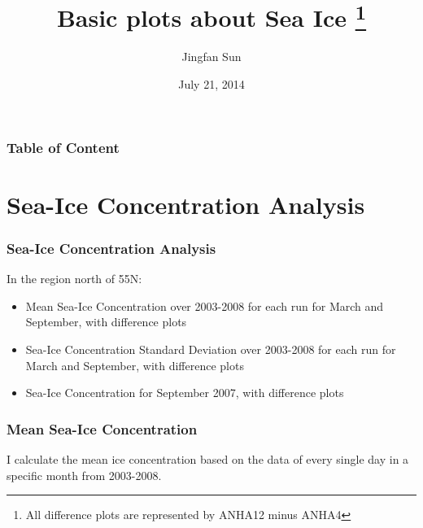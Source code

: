 \documentclass{beamer}
\title{Basic plots about Sea Ice
   \thanks{All difference plots are represented by ANHA12 minus ANHA4}
}
\author{
Jingfan Sun
}
\date{July 21, 2014}
\begin{document}
 

\begin{frame}
\titlepage
\end{frame}

\begin{frame}
\frametitle{Table of Content}
\tableofcontents[*]
\end{frame}

%
%
%
%

\section{Sea-Ice Concentration Analysis}
\begin{frame}
\frametitle{Sea-Ice Concentration Analysis}

In the region north of 55N: 

\begin{itemize}

\item Mean Sea-Ice Concentration over 2003-2008 for each run for March and September, with difference plots
\item Sea-Ice Concentration Standard Deviation over 2003-2008 for each run for March and September, with difference plots
\item Sea-Ice Concentration for September 2007, with difference plots

\end{itemize}

\end{frame}

\begin{frame}
\frametitle{Mean Sea-Ice Concentration}
I calculate the mean ice concentration based on the data of every single day in a specific month from 2003-2008. 
\end{frame}
\end{document}
